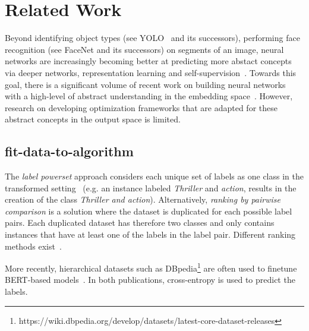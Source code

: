 
\section{Related Work}
\label{sec:org2aceb9f}


Beyond identifying object types (see YOLO~\cite{YOLO} and its successors), performing face recognition (see FaceNet\cite{FaceNet} and its successors) on segments of an image, neural networks
are increasingly becoming better at predicting more abstact concepts via
deeper networks, representation learning and self-supervision~\citep[see,
e.g.,][]{SS,Rep}. Towards this goal, there is a significant volume of recent
work on building neural networks with a high-level of abstract understanding
in the embedding space~. However, research on developing optimization
frameworks that are adapted for these abstract concepts in the output space is
limited.

\subsection{fit-data-to-algorithm}

The \textit{label powerset} approach considers each unique set of labels as one class in the transformed setting~\cite{multilabelComparison} (e.g. an instance labeled \textit{Thriller} and \textit{action}, results in the creation of the class \textit{Thriller and action}). Alternatively, \textit{ranking by pairwise comparison} is a solution where the dataset is duplicated for each possible label pairs. Each duplicated dataset has therefore two classes and only contains instances that have at least one of the labels in the label pair. Different ranking methods exist~\cite{pairwiseBinary, pairwiseNet}. 

More recently, hierarchical datasets such as DBpedia\footnote{https://wiki.dbpedia.org/develop/datasets/latest-core-dataset-releases} are often used to finetune BERT-based models~\cite{XLNet, bigBird}. In both publications, cross-entropy is used to predict the labels.



